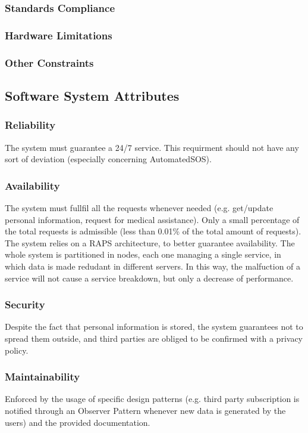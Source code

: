 \documentclass[12pt,a4paper]{article}
\begin{document}
		\subsubsection{Standards Compliance}
		\subsubsection{Hardware Limitations}
		\subsubsection{Other Constraints}
	
	\subsection{Software System Attributes}
		\subsubsection{Reliability}
		The system must guarantee a 24/7 service. This requirment should not have any sort of deviation (especially concerning AutomatedSOS).
		\subsubsection{Availability}
		The system must fullfil all the requests whenever needed (e.g. get/update personal information, request for medical assistance). Only a small percentage of the total requests is admissible (less than 0.01\% of the total amount of requests). The system relies on a RAPS architecture, to better guarantee availability. The whole system is partitioned in nodes, each one managing a single service, in which data is made redudant in different servers. In this way, the malfuction of a service will not cause a service breakdown, but only a decrease of performance.
		\subsubsection{Security}
		Despite the fact that personal information is stored, the system guarantees not to spread them outside, and third parties are obliged to be confirmed with a privacy policy.
		\subsubsection{Maintainability}
		Enforced by the usage of specific design patterns (e.g. third party subscription is notified through an Observer Pattern whenever new data is generated by the users) and the provided documentation.
\end{document}
